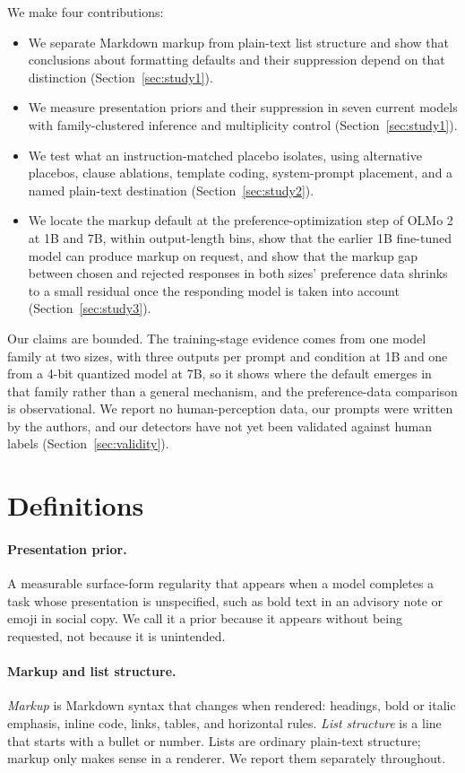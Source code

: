\documentclass[acmsmall,screen,review,anonymous]{acmart}
\begin{document}
We make four contributions:
\begin{itemize}
  \item We separate Markdown markup from plain-text list structure and show that conclusions about formatting defaults and their suppression depend on that distinction (Section~\ref{sec:study1}).
  \item We measure presentation priors and their suppression in seven current models with family-clustered inference and multiplicity control (Section~\ref{sec:study1}).
  \item We test what an instruction-matched placebo isolates, using alternative placebos, clause ablations, template coding, system-prompt placement, and a named plain-text destination (Section~\ref{sec:study2}).
  \item We locate the markup default at the preference-optimization step of OLMo 2 at 1B and 7B, within output-length bins, show that the earlier 1B fine-tuned model can produce markup on request, and show that the markup gap between chosen and rejected responses in both sizes' preference data shrinks to a small residual once the responding model is taken into account (Section~\ref{sec:study3}).
\end{itemize}

Our claims are bounded. The training-stage evidence comes from one model family at two sizes, with three outputs per prompt and condition at 1B and one from a 4-bit quantized model at 7B, so it shows where the default emerges in that family rather than a general mechanism, and the preference-data comparison is observational. We report no human-perception data, our prompts were written by the authors, and our detectors have not yet been validated against human labels (Section~\ref{sec:validity}).

\section{Definitions}

\paragraph{Presentation prior.} A measurable surface-form regularity that appears when a model completes a task whose presentation is unspecified, such as bold text in an advisory note or emoji in social copy. We call it a prior because it appears without being requested, not because it is unintended.

\paragraph{Markup and list structure.} \emph{Markup} is Markdown syntax that changes when rendered: headings, bold or italic emphasis, inline code, links, tables, and horizontal rules. \emph{List structure} is a line that starts with a bullet or number. Lists are ordinary plain-text structure; markup only makes sense in a renderer. We report them separately throughout.
\end{document}
